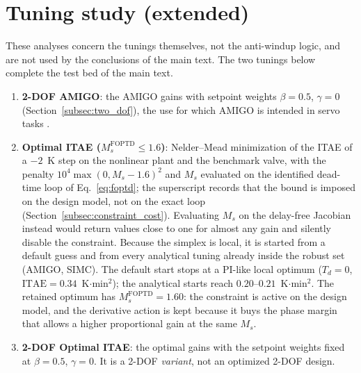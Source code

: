 
\section{Tuning study (extended)}
These analyses concern the tunings themselves, not the anti-windup logic, and are not used by the conclusions of the main text. The two tunings below complete the test bed of the main text.
\begin{enumerate}
    \item \textbf{2-DOF AMIGO}: the AMIGO gains with setpoint weights $\beta = 0.5$, $\gamma = 0$ (Section~\ref{subsec:two_dof}), the use for which AMIGO is intended in servo tasks \cite{astrom2004revisiting}.
    \item \textbf{Optimal ITAE ($M_s^{\mathrm{FOPTD}} \le 1.6$)}: Nelder--Mead minimization of the ITAE of a $-2$~K step on the nonlinear plant and the benchmark valve, with the penalty $10^4\max(0, M_s - 1.6)^2$ and $M_s$ evaluated on the identified dead-time loop of Eq.~\eqref{eq:foptd}; the superscript records that the bound is imposed on the design model, not on the exact loop (Section~\ref{subsec:constraint_cost}). Evaluating $M_s$ on the delay-free Jacobian instead would return values close to one for almost any gain and silently disable the constraint. Because the simplex is local, it is started from a default guess and from every analytical tuning already inside the robust set (AMIGO, SIMC). The default start stops at a PI-like local optimum ($T_d = 0$, $\mathrm{ITAE} = 0.34$~K$\cdot$min$^2$); the analytical starts reach $0.20$--$0.21$~K$\cdot$min$^2$. The retained optimum has $M_s^{\mathrm{FOPTD}} = 1.60$: the constraint is active on the design model, and the derivative action is kept because it buys the phase margin that allows a higher proportional gain at the same $M_s$.
    \item \textbf{2-DOF Optimal ITAE}: the optimal gains with the setpoint weights fixed at $\beta = 0.5$, $\gamma = 0$. It is a 2-DOF \emph{variant}, not an optimized 2-DOF design.
\end{enumerate}

